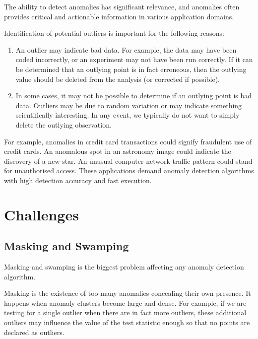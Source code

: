 The ability to detect anomalies has significant relevance, and anomalies often provides critical and actionable information in various application domains.

Identification of potential outliers is important for the following reasons: \cite{EngineeringStatsHandbook}

\begin{enumerate}
    \item An outlier may indicate bad data.
    For example, the data may have been coded incorrectly, or an experiment may not have been run correctly.
    If it can be determined that an outlying point is in fact erroneous, then the outlying value should be deleted from the analysis (or corrected if possible).
    \item In some cases, it may not be possible to determine if an outlying point is bad data.
    Outliers may be due to random variation or may indicate something scientifically interesting.
    In any event, we typically do not want to simply delete the outlying observation.
\end{enumerate}

For example, anomalies in credit card transactions could signify fraudulent use of credit cards.
An anomalous spot in an astronomy image could indicate the discovery of a new star.
An unusual computer network traffic pattern could stand for unauthorised access.
These applications demand anomaly detection algorithms with high detection accuracy and fast execution.

\section{Challenges}
\label{sec:anomaly-detection-challenges}


\subsection{Masking and Swamping}
\label{subsec:masking-and-swamping}

Masking and swamping is the biggest problem affecting any anomaly detection algorithm.

Masking is the existence of too many anomalies concealing their own presence.
It happens when anomaly clusters become large and dense.
For example, if we are testing for a single outlier when there are in fact more outliers, these additional outliers may influence the value of the test statistic enough so that no points are declared as outliers.

